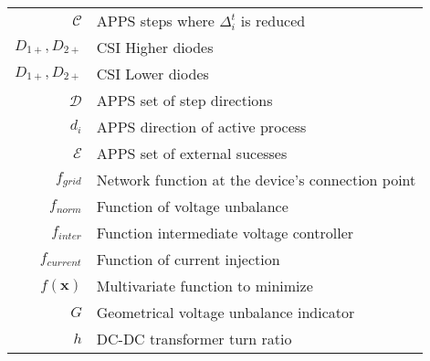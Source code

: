 \begin{scriptsize}
\begin{tabularx}{\textwidth}{r|X}
$\mathcal{C}$                           & APPS steps where $\Delta^t_i$ is reduced\\
$D_{1+},D_{2+}$										& CSI Higher diodes\\
$D_{1+},D_{2+}$										& CSI Lower diodes\\
$\mathcal{D}$                                       & APPS set of step directions\\
$d_i$												& APPS direction of active process\\
$\mathcal{E}$               & APPS set of external sucesses\\
$f_{grid}$										& Network function at the device's connection point\\
$f_{norm}$										& Function of voltage unbalance\\
$f_{inter}$										& Function intermediate voltage controller\\
$f_{current}$										& Function of current injection\\
  $f(\textbf{x})$										& Multivariate function to minimize\\
$G$                               & Geometrical voltage unbalance indicator \\
$h$                                                             & DC-DC transformer turn ratio\\


\end{tabularx}
\end{scriptsize}

